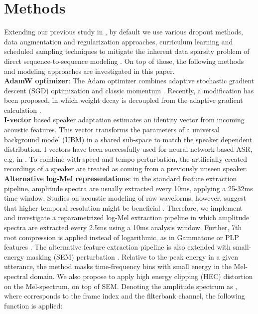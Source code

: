 \documentclass[a4paper]{article}
\begin{document}
\vspace{-1mm}
\section{Methods}
\vspace{-.0mm}
\label{sec:meth}
Extending our previous study in \cite{Tuske2020}, by default we use various dropout methods, data augmentation and regularization approaches, curriculum learning and scheduled sampling techniques 
to mitigate the inherent data sparsity problem of direct sequence-to-sequence modeling \cite{hinton2012,pmlr-v28-wan13,
Kanda2013,Ko15,Saon2019,Park2019,
Murray1994,Krueger2017,Szegedy2016,Krogh1992,
Bengio2009,Bengio2015,Amodei2016}.
On top of those, the following methods and modeling approaches are investigated in this paper.
\\ {\bf AdamW optimizer}:
The Adam optimizer combines adaptive stochastic gradient descent (SGD) optimization and classic momentum \cite{kingma2014adam}.
Recently, a modification has been proposed, in which weight decay is decoupled from the adaptive gradient calculation \cite{loshchilov2018decoupled}.
\\ {\bf I-vector} based speaker adaptation estimates an identity vector from incoming acoustic features.
This vector transforms the parameters of a universal background model (UBM) in a shared sub-space to match the speaker dependent distribution.
I-vectors have been successfully used for neural network based ASR, e.g. in \cite{saon13,Kitza2019,saon21}.
To combine with speed and tempo perturbation, the artificially created recordings of a speaker are treated as coming from a previously unseen speaker.
\\ {\bf Alternative log-Mel representations}:
in the standard feature extraction pipeline, amplitude spectra are usually extracted every 10ms, applying a 25-32ms time window.
Studies on acoustic modeling of raw waveforms, however, suggest that higher temporal resolution might be beneficial \cite{Zhu2016,tuske2018:waveform}.
Therefore, we implement and investigate a reparametrized log-Mel extraction pipeline in which
amplitude spectra are extracted every 2.5ms using a 10ms analysis window.
Further, 7th root compression is applied instead of logarithmic, as in Gammatone or PLP features \cite{Hermansky1990,schlueter07}.
The alternative feature extraction pipeline is also extended with small-energy masking (SEM) perturbation \cite{Kim2020}.
Relative to the peak energy in a given utterance, the method masks time-frequency bins with small energy in the Mel-spectral domain.
We also propose to apply high energy clipping (HEC) distortion on the Mel-spectrum, on top of SEM.
Denoting the amplitude spectrum as , where  corresponds to the frame index and  the filterbank channel, the following function is applied:
\end{document}
